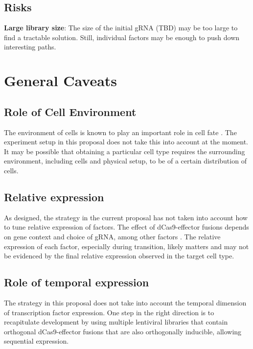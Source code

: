 \documentclass[10pt]{article}
\begin{document}
\subsection{Risks}

\noindent \textbf{Large library size}: The size of the initial gRNA (TBD) may be too large to find a tractable solution. Still, individual factors may be enough to push down interesting paths.

\section*{General Caveats}

\subsection*{Role of Cell Environment}

The environment of cells is known to play an important role in cell fate \cite{drummond2008stem}. The experiment setup in this proposal does not take this into account at the moment. It may be possible that obtaining a particular cell type requires the surrounding environment, including cells and physical setup, to be of a certain distribution of cells.

\subsection*{Relative expression}

As designed, the strategy in the current proposal has not taken into account how to tune relative expression of factors. The effect of dCas9-effector fusions depends on gene context and choice of gRNA, among other factors \cite{konermann2014genome, chavez2015VPR}. The relative expression of each factor, especially during transition, likely matters and may not be evidenced by the final relative expression observed in the target cell type.

\subsection*{Role of temporal expression}

The strategy in this proposal does not take into account the temporal dimension of transcription factor expression. One step in the right direction is to recapitulate development by using multiple lentiviral libraries that contain orthogonal dCas9-effector fusions that are also orthogonally inducible, allowing sequential expression.
\end{document}

